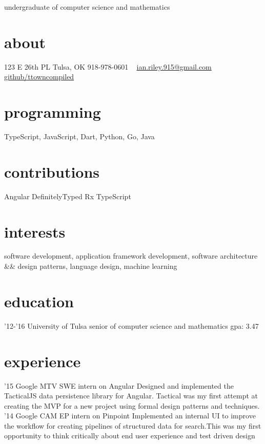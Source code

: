 \documentclass[]{friggeri-cv}
\begin{document}
       {undergraduate of computer science and mathematics}


\begin{aside}
  \section{about}
    123 E 26th PL
    Tulsa, OK
    918-978-0601
    ~
    \href{mailto:ian.riley.915@gmail.com}{ian.riley.915@gmail.com}
    \href{https://github.com/ttowncompiled}{github/ttowncompiled}
  \section{programming}
    TypeScript, JavaScript, Dart, Python, Go, Java
  \section{contributions}
    Angular
    DefinitelyTyped
    Rx
    TypeScript
\end{aside}

\section{interests}
software development, application framework development, software architecture \&\& design patterns, language design, machine learning

\section{education}

\begin{entrylist}
  \entry
    {'12-'16}
    {University of Tulsa}
    {senior of computer science and mathematics}
    {gpa: 3.47}
\end{entrylist}

\section{experience}

\begin{entrylist}
  \entry
    {'15}
    {Google MTV}
    {SWE intern on Angular}
    {Designed and implemented the TacticalJS data persistence library for Angular. Tactical was my first attempt at creating the MVP for a new project using formal design patterns and techniques.}
  \entry
    {'14}
    {Google CAM}
    {EP intern on Pinpoint}
    {Implemented an internal UI to improve the workflow for creating pipelines of structured data for search.This was my first opportunity to think critically about end user experience and test driven design}
\end{entrylist}
\end{document}
